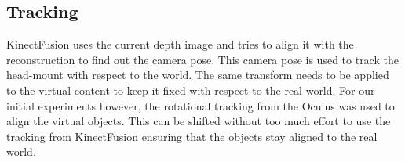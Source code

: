 \subsection{Tracking}
KinectFusion uses the current depth image and tries to align it with the reconstruction to find out the camera pose. This camera pose is used to track the head-mount with respect to the world. The same transform needs to be applied to the virtual content to keep it fixed with respect to the real world. For our initial experiments however, the rotational tracking from the Oculus was used to align the virtual objects. This can be shifted without too much effort to use the tracking from KinectFusion ensuring that the objects stay aligned to the real world.